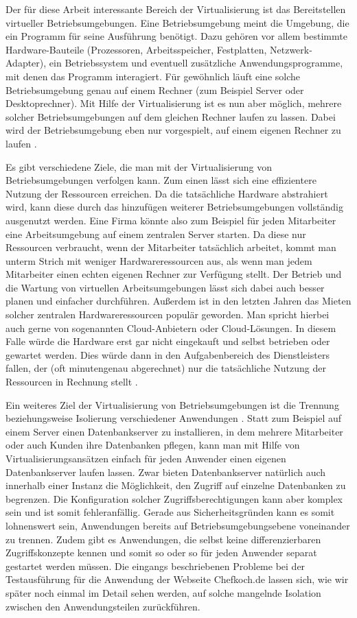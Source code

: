 Der für diese Arbeit interessante Bereich der Virtualisierung ist das Bereitstellen virtueller Betriebsumgebungen. Eine Betriebsumgebung meint die Umgebung, die ein Programm für seine Ausführung benötigt. Dazu gehören vor allem bestimmte Hardware-Bauteile (Prozessoren, Arbeitsspeicher, Festplatten, Netzwerk-Adapter), ein Betriebssystem und eventuell zusätzliche Anwendungsprogramme, mit denen das Programm interagiert. Für gewöhnlich läuft eine solche Betriebsumgebung genau auf einem Rechner (zum Beispiel Server oder Desktoprechner). Mit Hilfe der Virtualisierung ist es nun aber möglich, mehrere solcher Betriebsumgebungen auf dem gleichen Rechner laufen zu lassen. Dabei wird der Betriebsumgebung eben nur vorgespielt, auf einem eigenen Rechner zu laufen \citep[Vgl.][Abstract]{DamMohAnd12}.

Es gibt verschiedene Ziele, die man mit der Virtualisierung von Betriebsumgebungen verfolgen kann. Zum einen lässt sich eine effizientere Nutzung der Ressourcen erreichen. Da die tatsächliche Hardware abstrahiert wird, kann diese durch das hinzufügen weiterer Betriebsumgebungen vollständig ausgenutzt werden. Eine Firma könnte also zum Beispiel für jeden Mitarbeiter eine Arbeitsumgebung auf einem zentralen Server starten. Da diese nur Ressourcen verbraucht, wenn der Mitarbeiter tatsächlich arbeitet, kommt man unterm Strich mit weniger Hardwareressourcen aus, als wenn man jedem Mitarbeiter einen echten eigenen Rechner zur Verfügung stellt. Der Betrieb und die Wartung von virtuellen Arbeitsumgebungen lässt sich dabei auch besser planen und einfacher durchführen. Außerdem ist in den letzten Jahren das Mieten solcher zentralen Hardwareressourcen populär geworden. Man spricht hierbei auch gerne von sogenannten Cloud-Anbietern oder Cloud-Lösungen. In diesem Falle würde die Hardware erst gar nicht eingekauft und selbst betrieben oder gewartet werden. Dies würde dann in den Aufgabenbereich des Dienstleisters fallen, der (oft minutengenau abgerechnet) nur die tatsächliche Nutzung der Ressourcen in Rechnung stellt \citep[Vgl.][S. 7]{ZhaChe14}.

Ein weiteres Ziel der Virtualisierung von Betriebsumgebungen ist die Trennung beziehungsweise Isolierung verschiedener Anwendungen \citep[Vgl.][Abstract]{Schee14}. Statt zum Beispiel auf einem Server einen Datenbankserver zu installieren, in dem mehrere Mitarbeiter oder auch Kunden ihre Datenbanken pflegen, kann man mit Hilfe von Virtualisierungsansätzen einfach für jeden Anwender einen eigenen Datenbankserver laufen lassen. Zwar bieten Datenbankserver natürlich auch innerhalb einer Instanz die Möglichkeit, den Zugriff auf einzelne Datenbanken zu begrenzen. Die Konfiguration solcher Zugriffsberechtigungen kann aber komplex sein und ist somit fehleranfällig. Gerade aus Sicherheitsgründen kann es somit lohnenswert sein, Anwendungen bereits auf Betriebsumgebungsebene voneinander zu trennen. Zudem gibt es Anwendungen, die selbst keine differenzierbaren Zugriffskonzepte kennen und somit so oder so für jeden Anwender separat gestartet werden müssen. Die eingangs beschriebenen Probleme bei der Testausführung für die Anwendung der Webseite Chefkoch.de lassen sich, wie wir später noch einmal im Detail sehen werden, auf solche mangelnde Isolation zwischen den Anwendungsteilen zurückführen.

